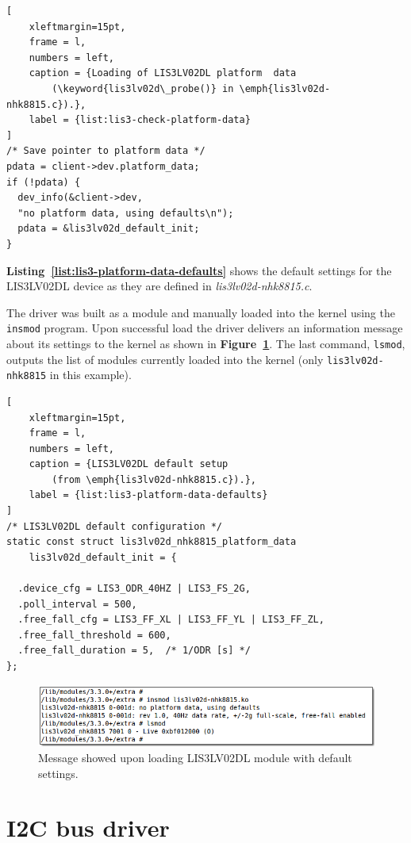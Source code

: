 \documentclass[a4paper,10pt]{article}
\newcommand{\keyword}[1]{\texttt{#1}}
\newcommand{\reff}[1]{\textbf{Figure~\ref{#1}}}
\newcommand{\refl}[1]{\textbf{Listing~\ref{#1}}}
\begin{document}
\begin{multicols}{2}
\begin{lstlisting}[
	xleftmargin=15pt,
	frame = l,
	numbers = left,
	caption = {Loading of LIS3LV02DL platform  data
		(\keyword{lis3lv02d\_probe()} in \emph{lis3lv02d-nhk8815.c}).},
	label = {list:lis3-check-platform-data}
]
/* Save pointer to platform data */
pdata = client->dev.platform_data;
if (!pdata) {
  dev_info(&client->dev,
  "no platform data, using defaults\n");
  pdata = &lis3lv02d_default_init;
}
\end{lstlisting}

\refl{list:lis3-platform-data-defaults} shows the default settings for the
LIS3LV02DL device as they are defined in \emph{lis3lv02d-nhk8815.c}.

The driver was built as a module and manually loaded into the kernel using the
\keyword{insmod} program. Upon successful load the driver delivers an information
message about its settings to the kernel as shown in \reff{fig:lis3-insmod}.
The last command, \keyword{lsmod}, outputs the list of modules currently loaded
into the kernel (only \keyword{lis3lv02d-nhk8815} in this example).

\begin{lstlisting}[
	xleftmargin=15pt,
	frame = l,
	numbers = left,
	caption = {LIS3LV02DL default setup
		(from \emph{lis3lv02d-nhk8815.c}).},
	label = {list:lis3-platform-data-defaults}
]
/* LIS3LV02DL default configuration */
static const struct lis3lv02d_nhk8815_platform_data
	lis3lv02d_default_init = {

  .device_cfg = LIS3_ODR_40HZ | LIS3_FS_2G,
  .poll_interval = 500,
  .free_fall_cfg = LIS3_FF_XL | LIS3_FF_YL | LIS3_FF_ZL,
  .free_fall_threshold = 600,
  .free_fall_duration = 5,	/* 1/ODR [s] */
};
\end{lstlisting}

\begin{figure}[t]
 \includegraphics[width=11.8cm]{./figures/dump-lis3lv02d-insmod.png}
 \caption{Message showed upon loading LIS3LV02DL module with default settings.}
 \label{fig:lis3-insmod}
\end{figure}



\section{I2C bus driver}
\label{sec:i2c_bus_driver}


\end{multicols}
\end{document}
